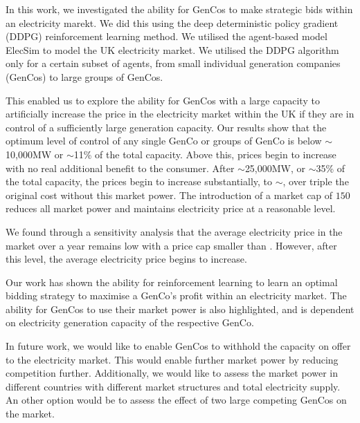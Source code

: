 In this work, we investigated the ability for GenCos to make strategic bids within an electricity marekt. We did this using the deep deterministic policy gradient (DDPG) reinforcement learning method. We utilised the agent-based model ElecSim to model the UK electricity market. We utilised the DDPG algorithm only for a certain subset of agents, from small individual generation companies (GenCos) to large groups of GenCos. 

This enabled us to explore the ability for GenCos with a large capacity to artificially increase the price in the electricity market within the UK if they are in control of a sufficiently large generation capacity. Our results show that the optimum level of control of any single GenCo or groups of GenCo is below ${\sim}$10,000MW or ${\sim}$11\% of the total capacity. Above this, prices begin to increase with no real additional benefit to the consumer. After ${\sim}$25,000MW, or ${\sim}$35\% of the total capacity, the prices begin to increase substantially, to ${\sim}$, over triple the original cost without this market power. The introduction of a market cap of \textsterling$150$ reduces all market power and maintains electricity price at a reasonable level.

We found through a sensitivity analysis that the average electricity price in the market over a year remains low with a price cap smaller than . However, after this level, the average electricity price begins to increase.


Our work has shown the ability for reinforcement learning to learn an optimal bidding strategy to maximise a GenCo's profit within an electricity market. The ability for GenCos to use their market power is also highlighted, and is dependent on electricity generation capacity of the respective GenCo.

In future work, we would like to enable GenCos to withhold the capacity on offer to the electricity market. This would enable further market power by reducing competition further.  Additionally, we would like to assess the market power in different countries with different market structures and total electricity supply. An other option would be to assess the effect of two large competing GenCos on the market.

